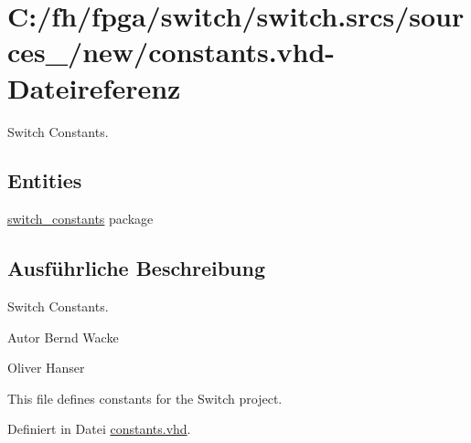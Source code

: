 \hypertarget{constants_8vhd}{}\section{C\+:/fh/fpga/switch/switch.srcs/sources\+\_/new/constants.vhd-\/\+Dateireferenz}
\label{constants_8vhd}


Switch Constants.  


\subsection*{Entities}
\begin{DoxyCompactItemize}
\item 
\mbox{\hyperlink{classswitch__constants}{switch\+\_\+constants}} package
\end{DoxyCompactItemize}


\subsection{Ausführliche Beschreibung}
Switch Constants. 

\begin{DoxyAuthor}{Autor}
Bernd Wacke 

Oliver Hanser
\end{DoxyAuthor}
This file defines constants for the Switch project. 

Definiert in Datei \mbox{\hyperlink{constants_8vhd_source}{constants.\+vhd}}.

